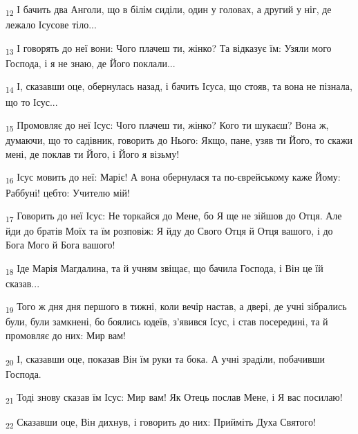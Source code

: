 \begin{tcolorbox}
\textsubscript{12} І бачить два Анголи, що в білім сиділи, один у головах, а другий у ніг, де лежало Ісусове тіло...
\end{tcolorbox}
\begin{tcolorbox}
\textsubscript{13} І говорять до неї вони: Чого плачеш ти, жінко? Та відказує їм: Узяли мого Господа, і я не знаю, де Його поклали...
\end{tcolorbox}
\begin{tcolorbox}
\textsubscript{14} І, сказавши оце, обернулась назад, і бачить Ісуса, що стояв, та вона не пізнала, що то Ісус...
\end{tcolorbox}
\begin{tcolorbox}
\textsubscript{15} Промовляє до неї Ісус: Чого плачеш ти, жінко? Кого ти шукаєш? Вона ж, думаючи, що то садівник, говорить до Нього: Якщо, пане, узяв ти Його, то скажи мені, де поклав ти Його, і Його я візьму!
\end{tcolorbox}
\begin{tcolorbox}
\textsubscript{16} Ісус мовить до неї: Маріє! А вона обернулася та по-єврейському каже Йому: Раббуні! цебто: Учителю мій!
\end{tcolorbox}
\begin{tcolorbox}
\textsubscript{17} Говорить до неї Ісус: Не торкайся до Мене, бо Я ще не зійшов до Отця. Але йди до братів Моїх та їм розповіж: Я йду до Свого Отця й Отця вашого, і до Бога Мого й Бога вашого!
\end{tcolorbox}
\begin{tcolorbox}
\textsubscript{18} Іде Марія Магдалина, та й учням звіщає, що бачила Господа, і Він це їй сказав...
\end{tcolorbox}
\begin{tcolorbox}
\textsubscript{19} Того ж дня дня першого в тижні, коли вечір настав, а двері, де учні зібрались були, були замкнені, бо боялись юдеїв, з'явився Ісус, і став посередині, та й промовляє до них: Мир вам!
\end{tcolorbox}
\begin{tcolorbox}
\textsubscript{20} І, сказавши оце, показав Він їм руки та бока. А учні зраділи, побачивши Господа.
\end{tcolorbox}
\begin{tcolorbox}
\textsubscript{21} Тоді знову сказав їм Ісус: Мир вам! Як Отець послав Мене, і Я вас посилаю!
\end{tcolorbox}
\begin{tcolorbox}
\textsubscript{22} Сказавши оце, Він дихнув, і говорить до них: Прийміть Духа Святого!
\end{tcolorbox}

